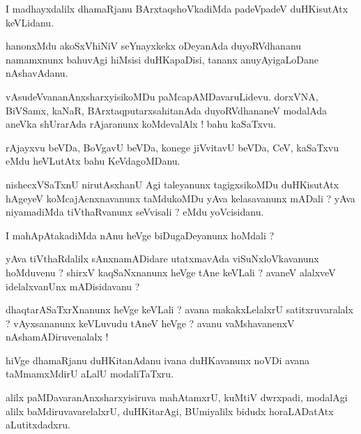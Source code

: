 \documentclass{article}
\begin{document}
\begin{mn}
I madhayxdalilx dhamaRjanu BArxtaqshoVkadiMda padeVpadeV duHKisutAtx keVLidanu.
\end{mn}

\begin{mn}
hanonxMdu akoSxVhiNiV seYnayxkekx oDeyanAda  duyoRVdhananu namamxnunx bahuvAgi hiMsisi 
duHKapaDisi, tananx anuyAyigaLoDane nAshavAdanu.
\end{mn}

\begin{mn}
vAsudeVvananAnxsharxyisikoMDu paMcapAMDavaruLidevu. dorxVNA, BiVSamx, kaNaR, 
BArxtaqputarxsahitanAda duyoRVdhananeV modalAda aneVka shUrarAda rAjaranunx koMdevalAlx ! bahu 
kaSaTxvu.
\end{mn}

\begin{mn}
rAjayxvu beVDa, BoVgavU beVDa, konege jiVvitavU beVDa, CeV, kaSaTxvu eMdu heVLutAtx bahu 
KeVdagoMDanu.
\end{mn}

\begin{mn}
nishecxVSaTxnU nirutAsxhanU Agi taleyanunx tagigxsikoMDu duHKisutAtx hAgeyeV koMcajAcnxnavanunx 
taMdukoMDu yAva kelasavanunx mADali ? yAva niyamadiMda tiVthaRvanunx seVvisali ? eMdu yoVcisidanu.
\end{mn}

\begin{mn}
I mahApAtakadiMda nAnu heVge biDugaDeyanunx  hoMdali ?
\end{mn}

\begin{mn}
yAva tiVthaRdalilx sAnxnamADidare utatxmavAda viSuNxloVkavanunx hoMduvenu ? shirxV kaqSaNxnanunx 
heVge tAne keVLali ? avaneV alalxveV idelalxvanUnx mADisidavanu ?
\end{mn}

\begin{mn}
dhaqtarASaTxrXnanunx heVge keVLali ? avana makakxLelalxrU satitxruvaralalx ? vAyxsananunx keVLuvudu 
tAneV heVge ? avanu vaMshavanenxV nAshamADiruvenalalx !
\end{mn}

\begin{mn}
hiVge dhamaRjanu duHKitanAdanu ivana duHKavanunx noVDi avana taMmamxMdirU aLalU modaliTaTxru.
\end{mn}

\begin{mn}
alilx paMDavaranAnxsharxyisiruva mahAtamxrU, kuMtiV dwrxpadi, modalAgi alilx baMdiruvavarelalxrU,
duHKitarAgi, BUmiyalilx bidudx horaLADatAtx aLutitxdadxru.
\end{mn}
\end{document}
